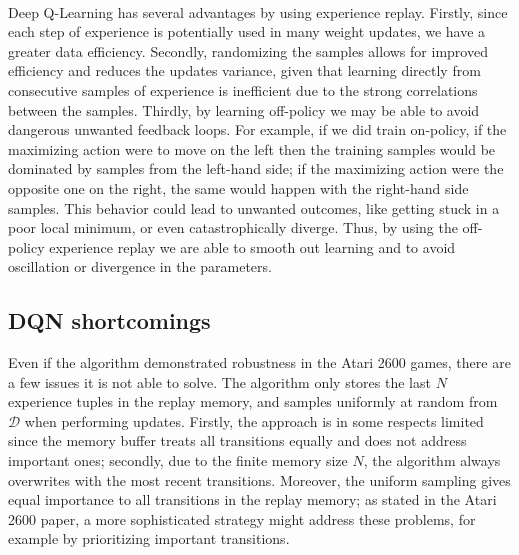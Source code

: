 \\
\indent Deep Q-Learning has several advantages by using experience replay. Firstly, since each step of experience is potentially used in many weight updates, we have a greater data efficiency. Secondly, randomizing the samples allows for improved efficiency and reduces the updates variance, given that learning directly from consecutive samples of experience is inefficient due to the strong correlations between the samples. Thirdly, by learning off-policy we may be able to avoid dangerous unwanted feedback loops. For example, if we did train on-policy, if the maximizing action were to move on the left then the training samples would be dominated by samples from the left-hand side; if the maximizing action were the opposite one on the right, the same would happen with the right-hand side samples. This behavior could lead to unwanted outcomes, like getting stuck in a poor local minimum, or even catastrophically diverge. Thus, by using the off-policy experience replay we are able to smooth out learning and to avoid oscillation or divergence in the parameters.

\subsection{DQN shortcomings}
Even if the algorithm demonstrated robustness in the Atari 2600 games, there are a few issues it is not able to solve. The algorithm only stores the last $N$ experience tuples in the replay memory, and samples uniformly at random from $\mathcal{D}$ when performing updates. Firstly, the approach is in some respects limited since the memory buffer treats all transitions equally and does not address important ones; secondly, due to the finite memory size $N$, the algorithm always overwrites with the most recent transitions. Moreover, the uniform sampling gives equal importance to all transitions in the replay memory; as stated in the Atari 2600 paper\cite{mnih2013playing}, a more sophisticated strategy might address these problems, for example by prioritizing important transitions.
